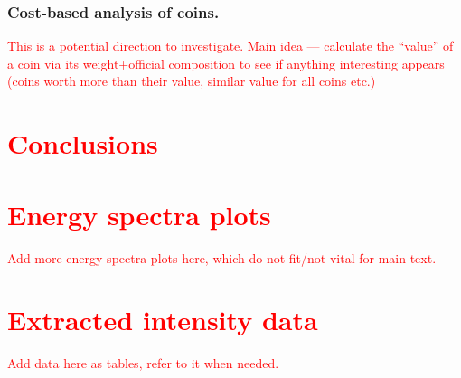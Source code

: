 \documentclass[11pt,a4paper,twoside,onecolumn]{article}
\newcommand{\reminder}[1]{\textcolor{red}{#1}}
\begin{document}
\subsubsection{Cost-based analysis of coins.}
\reminder{This is a potential direction to investigate. Main idea --- calculate the ``value'' of a coin via its weight+official composition to see if anything interesting appears (coins worth more than their value, similar value for all coins etc.)

\section{Conclusions}
\lipsum[1-5]

\newpage
\appendix
\section{Energy spectra plots}
Add more energy spectra plots here, which do not fit/not vital for main text.

\section{Extracted intensity data}
Add data here as tables, refer to it when needed.

}
\end{document}
